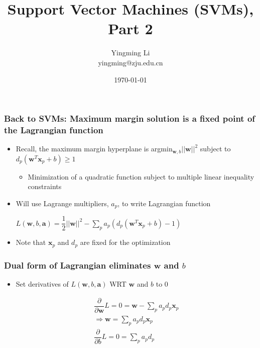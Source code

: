 \documentclass[12pt,notes,mathserif]{beamer}
\title{Support Vector Machines (SVMs), Part 2}
\author[YingmingLi]{Yingming Li \\ yingming@zju.edu.cn}
\institute[DSERC, ZJU]{Data Science \& Engineering Research Center, ZJU}
\date[\today]{\today}
\begin{document}

\begin{frame}[c]
	\titlepage
\end{frame}

\begin{frame}[c]
\frametitle{Back to SVMs: Maximum margin solution is a fixed point of the Lagrangian function}
\begin{itemize}
\item Recall, the maximum margin hyperplane is argmin$_{\bm{w},b}||\bm{w}||^2$ subject to $d_p(\bm{w}^T\bm{x}_p+b)\geqslant{}1$
\begin{itemize}
\item Minimization of a quadratic function subject to multiple linear inequality constraints
\end{itemize}
\item Will use Lagrange multipliers, $a_p$, to write Lagrangian function

$L(\bm{w},b,\bm{a})=\dfrac{1}{2}||\bm{w}||^2-\sum\limits_pa_p(d_p(\bm{w}^T\bm{x}_p+b)-1)$
\item Note that $\bm{x}_p$ and $d_p$ are fixed for the optimization
\end{itemize}

\end{frame}


\begin{frame}[c]
\frametitle{Dual form of Lagrangian eliminates $\bm{w}$ and $b$}
\begin{itemize}
\item Set derivatives of $L(\bm{w},b,\bm{a})$ WRT $\bm{w}$ and $b$ to 0

\begin{align*}
\dfrac{\partial}{\partial \bm{w}}L=0=\bm{w}-\sum_pa_pd_p\bm{x}_p\\
\Rightarrow \bm{w}=\sum_pa_pd_p\bm{x}_p\\
\dfrac{\partial}{\partial b}L=0=\sum_pa_pd_p
\end{align*}

\end{itemize}
\end{frame}
\end{document}
